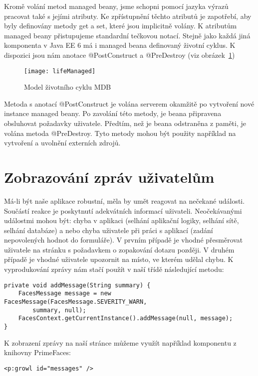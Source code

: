 \documentclass[122pt,oneside]{fithesis}
\begin{document}
Kromě volání metod managed beany, jsme schopni pomocí jazyka výrazů pracovat také s jejími atributy. Ke zpřístupnění těchto atributů je zapotřebí, aby byly definovány metody get a set, které jsou implicitně volány. K atributům managed beany přistupujeme standardní tečkovou notací. Stejně jako každá jiná komponenta v Java EE 6 má i managed beana definovaný životní cyklus. K dispozici jsou nám anotace @PostConstruct a @PreDestroy (viz obrázek~\ref{img:mdb})

\begin{figure}[!ht]
\centering
\texttt{[image: lifeManaged]}
\caption{Model životního cyklu MDB}
\label{img:mdb}
\end{figure}

Metoda s anotací @PostConstruct je volána serverem okamžitě po vytvoření nové instance managed beany. Po zavolání této metody, je beana připravena obsluhovat požadavky uživatele. Předtím, než je beana odstraněna z paměti, je volána metoda @PreDestroy. Tyto metody mohou být použity například na vytvoření a uvolnění externích zdrojů.

\section{Zobrazování zpráv uživatelům}
\label{jsfMessage}
Má-li být naše aplikace robustní, měla by umět reagovat na nečekané události. Součástí reakce je poskytnutí adekvátních informací uživateli. Neočekávanými událostmi mohou být: chyba v aplikaci (selhání aplikační logiky, selhání sítě, selhání databáze) a nebo chyba uživatele při práci s aplikací (zadání nepovolených hodnot do formuláře). V prvním případě je vhodné přesměrovat uživatele na stránku s požadavkem o zopakování dotazu později. V druhém případě je vhodné uživatele upozornit na místo, ve kterém udělal chybu. K vyprodukování zprávy nám stačí použít v naší třídě následující metodu:

\begin{lstlisting}
private void addMessage(String summary) {
	FacesMessage message = new FacesMessage(FacesMessage.SEVERITY_WARN, 
		summary, null);
	FacesContext.getCurrentInstance().addMessage(null, message);
}
\end{lstlisting}

K zobrazení zprávy na naší stránce můžeme využít například komponentu z knihovny PrimeFaces:
\begin{lstlisting}
<p:growl id="messages" />
\end{lstlisting}
\end{document}
